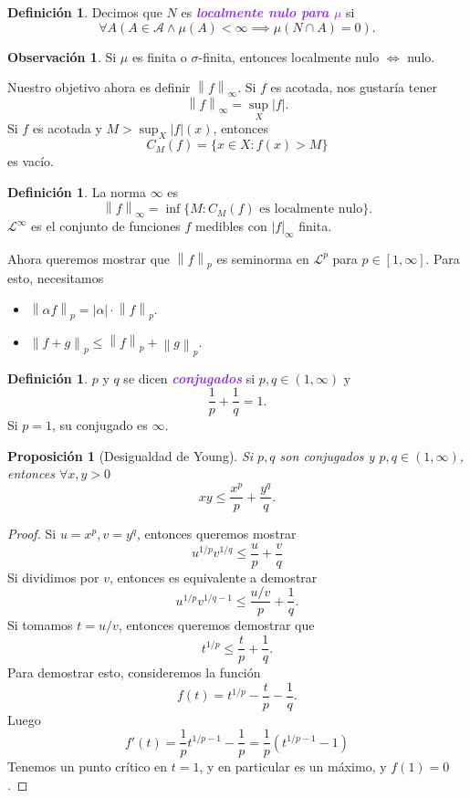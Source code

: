 \documentclass{article}
\newtheorem{proposition}[theorem]{Proposición}
\theoremstyle{definition}
\newtheorem{definition}[theorem]{Definición}
\newtheorem*{obs}{Observación}
\theoremstyle{remark}
\numberwithin{equation}{section}
\newcommand{\Acal}{\mathcal{A}}
\newcommand{\Lcal}{\mathcal{L}}
\renewcommand{\a}{\alpha}
\newcommand{\oo}{\infty}
\newcommand{\abs}[1]{\left| #1 \right|}
\newcommand{\norm}[1]{\left\lVert #1 \right\rVert}
\newcommand{\br}[1]{\left( #1 \right)}
\newcommand{\wea}[1]{\textcolor{BlueViolet}{\textbf{\emph{#1}}}}
\begin{document}
\begin{definition}
  Decimos que $N$ es \wea{localmente nulo para $\mu$} si 
  \[ \forall A \br{A \in \Acal \land \mu(A) < \oo \implies \mu(N \cap A) = 0}. \]
\end{definition}

\begin{obs}
  Si $\mu$ es finita o $\sigma$-finita, entonces localmente nulo $\iff$ nulo.
\end{obs}

Nuestro objetivo ahora es definir $\norm{f}_\oo$. Si $f$ es acotada, nos gustaría tener
\[ \norm{f}_\oo = \sup_X \abs{f}. \]
Si $f$ es acotada y $M > \sup_X \abs f (x)$, entonces 
\[ C_M(f) = \{x \in X \colon f(x) > M\} \]
es vacío.

\begin{definition}
  La norma $\oo$ es 
  \[ \norm{f}_\oo = \inf\{M \colon C_M(f) \text{ es localmente nulo}\}. \]
  $\Lcal^\oo$ es el conjunto de funciones $f$ medibles con $\abs{f}_\oo$ finita.
\end{definition}

Ahora queremos mostrar que $\norm{f}_p$ es seminorma en $\Lcal^p$ para $p \in [1,\oo]$. Para esto, necesitamos
\begin{itemize}
  \item $\norm{\a f}_p = \abs{\a} \cdot \norm{f}_p$.
  \item $\norm{f+g}_p \leq \norm{f}_p + \norm{g}_p$.
\end{itemize}

\begin{definition}
  $p$ y $q$ se dicen \wea{conjugados} si $p,q \in (1,\oo)$ y 
  \[ \frac1p + \frac1q = 1. \]
  Si $p = 1$, su conjugado es $\oo$.
\end{definition}

\newpage
\begin{proposition}
  [Desigualdad de Young]
  Si $p,q$ son conjugados y $p,q \in (1,\oo)$, entonces $\forall x,y>0$ 
  \[ xy \leq \frac{x^p}{p} + \frac{y^q}{q}. \]
\end{proposition}
\begin{proof}
  Si $u = x^p, v=y^q$, entonces queremos mostrar
  \[ u^{1/p} v^{1/q} \leq \frac{u}{p} + \frac{v}{q} \]
  Si dividimos por $v$, entonces es equivalente a demostrar 
  \[ u^{1/p} v^{1/q-1} \leq \frac{u/v}{p} + \frac{1}{q}. \]
  Si tomamos $t = u/v$, entonces queremos demostrar que
  \[ t^{1/p} \leq \frac{t}{p} + \frac{1}{q}. \]
  Para demostrar esto, consideremos la función
  \[ f(t) = t^{1/p} - \frac{t}{p} - \frac{1}{q}. \]
  Luego 
  \[ f'(t) = \frac{1}{p} t^{1/p - 1} - \frac{1}{p} = \frac{1}{p}(t^{1/p-1} - 1) \]
  Tenemos un punto crítico en $t=1$, y en particular es un máximo, y $f(1) = 0$.
\end{proof}
\end{document}
